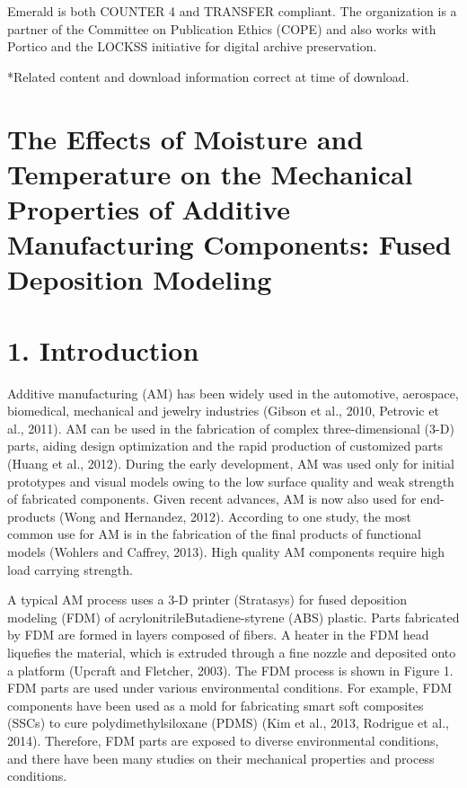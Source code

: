 \documentclass[10pt]{article}
\begin{document}
Emerald is both COUNTER 4 and TRANSFER compliant. The organization is a partner of the Committee on Publication Ethics (COPE) and also works with Portico and the LOCKSS initiative for digital archive preservation.

*Related content and download information correct at time of download.

\section*{The Effects of Moisture and Temperature on the Mechanical Properties of Additive Manufacturing Components: Fused Deposition Modeling}
\section*{1. Introduction}
Additive manufacturing (AM) has been widely used in the automotive, aerospace, biomedical, mechanical and jewelry industries (Gibson et al., 2010, Petrovic et al., 2011). AM can be used in the fabrication of complex three-dimensional (3-D) parts, aiding design optimization and the rapid production of customized parts (Huang et al., 2012). During the early development, AM was used only for initial prototypes and visual models owing to the low surface quality and weak strength of fabricated components. Given recent advances, AM is now also used for end-products (Wong and Hernandez, 2012). According to one study, the most common use for AM is in the fabrication of the final products of functional models (Wohlers and Caffrey, 2013). High quality AM components require high load carrying strength.

A typical AM process uses a 3-D printer (Stratasys) for fused deposition modeling (FDM) of acrylonitrileButadiene-styrene (ABS) plastic. Parts fabricated by FDM are formed in layers composed of fibers. A heater in the FDM head liquefies the material, which is extruded through a fine nozzle and deposited onto a platform (Upcraft and Fletcher, 2003). The FDM process is shown in Figure 1. FDM parts are used under various environmental conditions. For example, FDM components have been used as a mold for fabricating smart soft composites (SSCs) to cure polydimethylsiloxane (PDMS) (Kim et al., 2013, Rodrigue et al., 2014). Therefore, FDM parts are exposed to diverse environmental conditions, and there have been many studies on their mechanical properties and process conditions.
\end{document}
